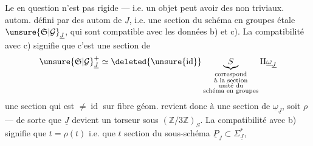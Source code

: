 

Le  en question n'est pas rigide --- i.e. un objet peut avoir des  non triviaux.  autom.  défini par des autom de $\underline{J}$, i.e. une section du schéma en groupes étale $\unsure{\mathfrak{S}|\mathcal G}_{\underline{J}}$, qui sont compatible avec les données b) et c). La compatibilité avec c) signifie que c'est une section de
\[
\unsure{\mathfrak{S}|\mathcal G}_{\underline{J}}^+\simeq\deleted{\unsure{\operatorname{id}}}\underbrace{S}_{\substack{\text{correspond}\\\text{à la section}\\\text{unité du}\\\text{schéma en groupes}}}\amalg\underline{\omega}_{\underline{J}}
\]
une section qui est $\ne\operatorname{id}$ sur  fibre géom. revient donc à une section de $\underline{\omega}_{\underline{J}}$, soit $\rho$ --- de sorte que $\underline{J}$ devient un torseur sous $(\mathbb{Z}/3\mathbb{Z})_S$. La compatibilité avec b) signifie que $t=\rho(t)$ i.e. que $t$  section du sous-schéma $\underline{P}_{\underline{J}}\subset\Sigma_{\underline{J}}^*$,
